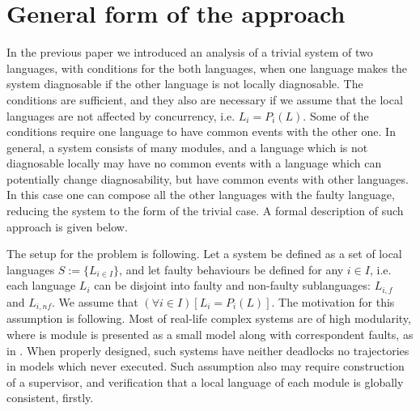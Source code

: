 \documentclass[a4paper, 10pt, conference]{ieeeconf}
\begin{document}
\section{General form of the approach}
\label{sec:General}


In the previous paper \cite{myadzelets_virtual_2013} we introduced an analysis
of a trivial system of two languages, with conditions for the both languages,
when one language makes the system diagnosable if the other language is not
locally diagnosable. The conditions are sufficient, and they also are necessary
if we assume that the local languages are not affected by concurrency, i.e. $L_i
= P_i(L)$. Some of the conditions require one language to have common events
with the other one. In general, a system consists of many modules, and a
language which is not diagnosable locally may have no common events with a
language which can potentially change diagnosability, but have common events
with other languages.
In this case one can compose all the other languages with the faulty language,
reducing the system to the form of the trivial case. A formal description of
such approach is given below.

The setup for the problem is following. Let a system be defined as a set of
local languages $S := \{L_{i\in I}\}$, and let faulty behaviours be defined for
any $i \in I$, i.e. each language $L_i$ can be disjoint into faulty and
non-faulty sublanguages: $L_{i,f}$ and $L_{i,nf}$. We assume that $(\forall i
\in I)\left[ L_i = P_i(L)\right]$. The motivation for this assumption is
following. Most of real-life complex systems are of high modularity, where is
module is presented as a small model along with correspondent faults, as in
\cite{sartini_methodology_2010}. When properly designed, such systems have
neither deadlocks no trajectories in models which never executed. Such
assumption also may require construction of a supervisor, and
verification that a local language of each module is globally consistent,
firstly.
\end{document}
